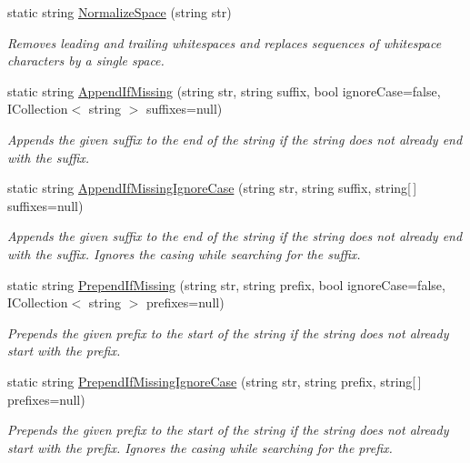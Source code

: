 \begin{DoxyCompactItemize}
static string \hyperlink{class_ultimate_1_1_utilities_1_1_string_utils_a16174740567835f1fa8c78c07287e462}{Normalize\+Space} (string str)
\begin{DoxyCompactList}\small\item\em Removes leading and trailing whitespaces and replaces sequences of whitespace characters by a single space. \end{DoxyCompactList}\item 
static string \hyperlink{class_ultimate_1_1_utilities_1_1_string_utils_ace59e0ce775e4dff88753793ea30f1b5}{Append\+If\+Missing} (string str, string suffix, bool ignore\+Case=false, I\+Collection$<$ string $>$ suffixes=null)
\begin{DoxyCompactList}\small\item\em Appends the given suffix to the end of the string if the string does not already end with the suffix. \end{DoxyCompactList}\item 
static string \hyperlink{class_ultimate_1_1_utilities_1_1_string_utils_ac348fbb0096f91329675bdada6d76a6b}{Append\+If\+Missing\+Ignore\+Case} (string str, string suffix, string\mbox{[}$\,$\mbox{]} suffixes=null)
\begin{DoxyCompactList}\small\item\em Appends the given suffix to the end of the string if the string does not already end with the suffix. Ignores the casing while searching for the suffix. \end{DoxyCompactList}\item 
static string \hyperlink{class_ultimate_1_1_utilities_1_1_string_utils_a1ed699a1e32e6ab6103afccb02ade8c7}{Prepend\+If\+Missing} (string str, string prefix, bool ignore\+Case=false, I\+Collection$<$ string $>$ prefixes=null)
\begin{DoxyCompactList}\small\item\em Prepends the given prefix to the start of the string if the string does not already start with the prefix. \end{DoxyCompactList}\item 
static string \hyperlink{class_ultimate_1_1_utilities_1_1_string_utils_ab05cdd9dab72f58f40c8930b4f23d3de}{Prepend\+If\+Missing\+Ignore\+Case} (string str, string prefix, string\mbox{[}$\,$\mbox{]} prefixes=null)
\begin{DoxyCompactList}\small\item\em Prepends the given prefix to the start of the string if the string does not already start with the prefix. Ignores the casing while searching for the prefix. \end{DoxyCompactList}\item 

\end{DoxyCompactItemize}
